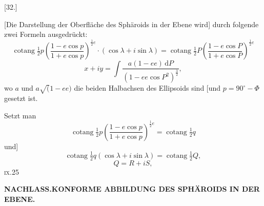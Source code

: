 \begin{center}[32.]\end{center}

[Die Darstellung der Oberfläche des Sphäroids in der Ebene wird] durch folgende zwei Formeln ausgedrückt:
\begin{equation*}
\operatorname{cotang}\tfrac12 p\left(\frac{1-e\cos p}{1+e\cos p}\right)^{\frac12 e}
\cdot(\cos\lambda+i\sin\lambda)
=\operatorname{cotang}\tfrac12 P\left(\frac{1-e\cos P}{1+e\cos P}\right)^{\frac12 e}
\tag*{1)}
\end{equation*}
\begin{equation*}
x+iy=\int\frac{a(1-ee)\,\mathrm dP}{(1-ee\cos P^2)^{\frac32}},
\tag*{2)}
\end{equation*}
\noindent wo \(a\) und \(a\surd(1-ee)\) die beiden Halbachsen des Ellipsoids sind
[und \(p=90^\circ-\Phi\) gesetzt ist.

Setzt man
\[
\operatorname{cotang}\tfrac12 p\left(\frac{1-e\cos p}{1+e\cos p}\right)^{\frac12 e}
=\operatorname{cotang}\tfrac12 q
\]
\noindent und]
\[
\operatorname{cotang}\tfrac12 q(\cos\lambda+i\sin\lambda)=\operatorname{cotang}\tfrac12 Q,
\]
\noindent [sowie]
\[
Q=R+iS,
\]
\noindent\textsc{ix.}\hfill 25\hspace*{.12\linewidth}\par

\par\clearpage
\noindent{}\hfill{\small\textbf{NACHLASS.\quad KONFORME ABBILDUNG DES SPHÄROIDS IN DER EBENE.}}\hfill\null\par\medskip

